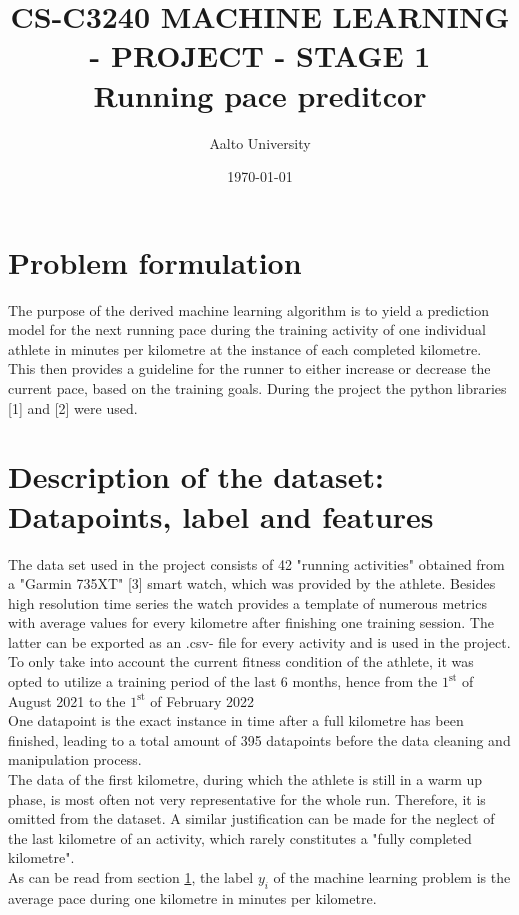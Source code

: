 \documentclass[11pt]{article}
\title{\Huge CS-C3240 MACHINE LEARNING - PROJECT - STAGE 1  \\Running pace preditcor}
\author{Aalto University}
\date{\today}
\begin{document}
\maketitle

\section{Problem formulation}
\label{section: 1}
The purpose of the derived machine learning algorithm is to yield a prediction model for the next running pace during the training activity of one individual athlete in minutes per kilometre at the instance of each completed kilometre. This then provides a guideline for the runner to either increase or decrease the current pace, based on the training goals. During  the project the python libraries [1] and [2] were used.

\section{Description of the dataset: Datapoints, label and features}
The data set used in the project consists of 42 "running activities" obtained from a "Garmin 735XT" [3] smart watch, which was provided by the athlete.  Besides high resolution time series the watch provides a template of numerous metrics with average values for every kilometre after finishing one training session. The latter can be exported as an .csv- file for every activity and is used in the project.
To only take into account the current fitness condition of the athlete, it was opted to utilize a training period of the last 6 months, hence from the $1^{\text{st}}$ of August 2021 to the $1^{\text{st}}$ of February 2022\\
One datapoint is the exact instance in time after a full kilometre has been finished, leading to a total amount of 395 datapoints before the data cleaning and manipulation process.\\
The data of the first kilometre, during which the athlete is still in a warm up phase, is most often not very representative for the whole run. Therefore, it is omitted from the dataset. A similar justification can be made for the neglect of the last kilometre of an activity, which rarely constitutes a "fully completed kilometre".\\
As can be read from section \ref{section: 1}, the label ${y_i}$ of the machine learning problem is the average pace during one kilometre in minutes per kilometre.\\
\end{document}
